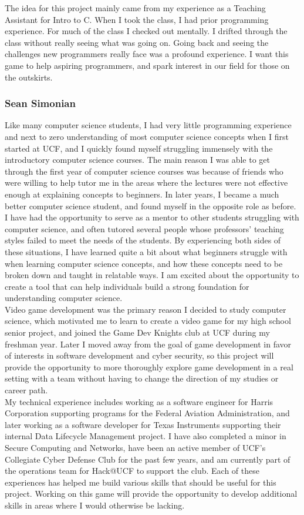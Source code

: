 The idea for this project mainly came from my experience as a Teaching Assistant for Intro to C. When I took the class, I had prior programming experience. For much of the class I checked out mentally. I drifted through the class without really seeing what was going on. Going back and seeing the challenges new programmers really face was a profound experience. I want this game to help aspiring programmers, and spark interest in our field for those on the outskirts.

\subsubsection{Sean Simonian}
Like many computer science students, I had very little programming experience and next to zero understanding of most computer science concepts when I first started at UCF, and I quickly found myself struggling immensely with the introductory computer science courses. The main reason I was able to get through the first year of computer science courses was because of friends who were willing to help tutor me in the areas where the lectures were not effective enough at explaining concepts to beginners. In later years, I became a much better computer science student, and found myself in the opposite role as before. I have had the opportunity to serve as a mentor to other students struggling with computer science, and often tutored several people whose professors’ teaching styles failed to meet the needs of the students. By experiencing both sides of these situations, I have learned quite a bit about what beginners struggle with when learning computer science concepts, and how these concepts need to be broken down and taught in relatable ways. I am excited about the opportunity to create a tool that can help individuals build a strong foundation for understanding computer science.\\

Video game development was the primary reason I decided to study computer science, which motivated me to learn to create a video game for my high school senior project, and joined the Game Dev Knights club at UCF during my freshman year. Later I moved away from the goal of game development in favor of interests in software development and cyber security, so this project will provide the opportunity to more thoroughly explore game development in a real setting with a team without having to change the direction of my studies or career path.\\

My technical experience includes working as a software engineer for Harris Corporation supporting programs for the Federal Aviation Administration, and later working as a software developer for Texas Instruments supporting their internal Data Lifecycle Management project. I have also completed a minor in Secure Computing and Networks, have been an active member of UCF’s Collegiate Cyber Defense Club for the past few years, and am currently part of the operations team for Hack@UCF to support the club. Each of these experiences has helped me build various skills that should be useful for this project. Working on this game will provide the opportunity to develop additional skills in areas where I would otherwise be lacking.\\

